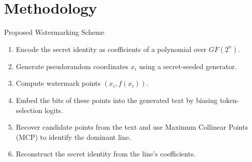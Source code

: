 \documentclass[xcolor=dvipsnames,aspectratio=169]{beamer}
\begin{document}
	\section{Methodology}
	\begin{frame}{Proposed Watermarking Scheme}
		\begin{enumerate}
			\item Encode the secret identity as coefficients of a polynomial over $GF(2^n)$.
			\item Generate pseudorandom coordinates $x_i$ using a secret-seeded generator.
			\item Compute watermark points $(x_i,f(x_i))$.
			\item Embed the bits of these points into the generated text by biasing token-selection logits.
			\item Recover candidate points from the text and use Maximum Collinear Points (MCP) to identify the dominant line.
			\item Reconstruct the secret identity from the line's coefficients.
		\end{enumerate}
	\end{frame}
	
	
	
\end{document}
